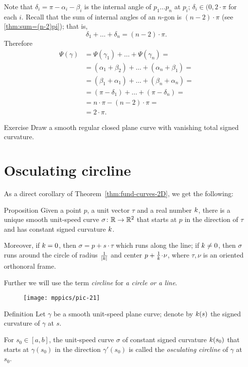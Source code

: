 Note that $\delta_i=\pi-\alpha_i-\beta_i$ is the internal angle of $p_1\dots p_n$ at $p_i$;
$\delta_i\in (0,2\cdot\pi$ for each $i$.
Recall that the sum of internal angles of an $n$-gon is $(n-2)\cdot \pi$ (see \ref{thm:sum=(n-2)pi}); that is,
\[\delta_1+\dots+\delta_n=(n-2)\cdot \pi.\]
Therefore 
\begin{align*}
\Psi(\gamma)&=\Psi(\gamma_1)+\dots+\Psi(\gamma_n)=
\\
&=(\alpha_1+\beta_2)+\dots+(\alpha_n+\beta_1)=
\\
&=(\beta_1+\alpha_1)+\dots+(\beta_n+\alpha_n)=
\\
&=(\pi-\delta_1)+\dots+(\pi-\delta_n)=
\\
&=n\cdot\pi-(n-2)\cdot \pi=
\\
&=2\cdot\pi.
\end{align*}
\qedsf

\begin{thm}{Exercise}\label{ex:zero-tsc}
Draw a smooth regular closed plane curve with vanishing total signed curvature.
\end{thm}

\section*{Osculating circline}

As a direct corollary of Theorem~\ref{thm:fund-curves-2D}, we get the following:

\begin{thm}{Proposition}\label{prop:circline}
Given a point $p$,
a unit vector $\tau$ 
and a real number $k$, there is a unique smooth unit-speed curve $\sigma\colon\mathbb{R}\to\mathbb{R}^2$ 
that starts at $p$ in the direction of $\tau$ and has constant signed curvature $k$.

Moreover, if $k=0$, then $\sigma=p+s\cdot \tau$ which runs along the line;
if $k\ne 0$, then $\sigma$ runs around the circle of radius $\tfrac1{|k|}$ and center $p+\tfrac1\skur\cdot \nu$, where $\tau,\nu$ is an oriented orthonoral frame.
\end{thm}

Further we will use the term \emph{circline} for \emph{a circle or a line}.

{

\begin{wrapfigure}{r}{30 mm}
\vskip-0mm
\centering
\texttt{[image: mppics/pic-21]}
\vskip0mm
\end{wrapfigure}

\begin{thm}{Definition}
Let $\gamma$ be a smooth unit-speed plane curve;
denote by $k(s)$ the signed curvature of $\gamma$ at $s$.

For $s_0 \in [a,b]$, the unit-speed curve $\sigma$ of constant signed curvature $k(s_0)$ that starts at $\gamma(s_0)$ in the direction $\gamma'(s_0)$ is called the \emph{osculating circline} of $\gamma$ at $s_0$.
\end{thm}

}

